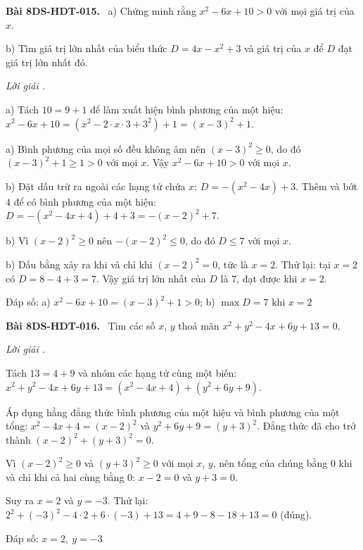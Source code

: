 \documentclass[12pt,a4paper]{article}
\newenvironment{problem}[1][]{\par\medskip\noindent\textbf{Bài #1.}\ }{\par}
\newenvironment{solution}[1][]{\par\noindent\textit{Lời giải #1.}\par}{\par}
\begin{document}
\begin{problem}[8DS-HDT-015]
a) Chứng minh rằng $x^2 - 6x + 10 > 0$ với mọi giá trị của $x$.

b) Tìm giá trị lớn nhất của biểu thức $D = 4x - x^2 + 3$ và giá trị của $x$ để $D$ đạt giá trị lớn nhất đó.

\begin{solution}
a) Tách $10 = 9 + 1$ để làm xuất hiện bình phương của một hiệu: $x^2 - 6x + 10 = (x^2 - 2 \cdot x \cdot 3 + 3^2) + 1 = (x - 3)^2 + 1$.

a) Bình phương của mọi số đều không âm nên $(x - 3)^2 \geq 0$, do đó $(x - 3)^2 + 1 \geq 1 > 0$ với mọi $x$. Vậy $x^2 - 6x + 10 > 0$ với mọi $x$.

b) Đặt dấu trừ ra ngoài các hạng tử chứa $x$: $D = -(x^2 - 4x) + 3$. Thêm và bớt $4$ để có bình phương của một hiệu: $D = -(x^2 - 4x + 4) + 4 + 3 = -(x - 2)^2 + 7$.

b) Vì $(x - 2)^2 \geq 0$ nên $-(x - 2)^2 \leq 0$, do đó $D \leq 7$ với mọi $x$.

b) Dấu bằng xảy ra khi và chỉ khi $(x - 2)^2 = 0$, tức là $x = 2$. Thử lại: tại $x = 2$ có $D = 8 - 4 + 3 = 7$. Vậy giá trị lớn nhất của $D$ là $7$, đạt được khi $x = 2$.

Đáp số: a) $\boxed{x^2 - 6x + 10 = (x - 3)^2 + 1 > 0}$; b) $\boxed{\max D = 7 \text{ khi } x = 2}$
\end{solution}
\end{problem}

\begin{problem}[8DS-HDT-016]
Tìm các số $x$, $y$ thoả mãn $x^2 + y^2 - 4x + 6y + 13 = 0$.

\begin{solution}
Tách $13 = 4 + 9$ và nhóm các hạng tử cùng một biến: $x^2 + y^2 - 4x + 6y + 13 = (x^2 - 4x + 4) + (y^2 + 6y + 9)$.

Áp dụng hằng đẳng thức bình phương của một hiệu và bình phương của một tổng: $x^2 - 4x + 4 = (x - 2)^2$ và $y^2 + 6y + 9 = (y + 3)^2$. Đẳng thức đã cho trở thành $(x - 2)^2 + (y + 3)^2 = 0$.

Vì $(x - 2)^2 \geq 0$ và $(y + 3)^2 \geq 0$ với mọi $x$, $y$, nên tổng của chúng bằng $0$ khi và chỉ khi cả hai cùng bằng $0$: $x - 2 = 0$ và $y + 3 = 0$.

Suy ra $x = 2$ và $y = -3$. Thử lại: $2^2 + (-3)^2 - 4 \cdot 2 + 6 \cdot (-3) + 13 = 4 + 9 - 8 - 18 + 13 = 0$ (đúng).

Đáp số: $\boxed{x = 2,\ y = -3}$
\end{solution}
\end{problem}
\end{document}
